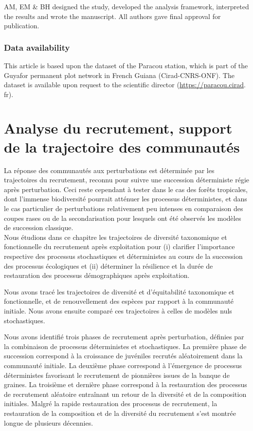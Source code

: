 \documentclass[
  11pt,
  french,
  A4paper,
  extrafontsizes,onecolumn,openright
  ]{memoir}
\begin{document}
AM, EM \& BH designed the study, developed the analysis framework,
interpreted the results and wrote the manuscript. All authors gave final
approval for publication.

\subsection{Data availability}\label{data-availability}

This article is based upon the dataset of the Paracou station, which is
part of the Guyafor permanent plot network in French Guiana
(Cirad-CNRS-ONF). The dataset is available upon request to the
scientific director (\url{https://paracou.cirad}. fr).

\chapter{Analyse du recrutement, support de la trajectoire des
communautés}\label{analyse-du-recrutement-support-de-la-trajectoire-des-communautes}

La réponse des communautés aux perturbations est déterminée par les
trajectoires du recrutement, reconnu pour suivre une succession
déterministe régie après perturbation. Ceci reste cependant à tester
dans le cas des forêts tropicales, dont l'immense biodiversité pourrait
atténuer les processus déterministes, et dans le cas particulier de
perturbations relativement peu intenses en comparaison des coupes rases
ou de la secondarisation pour lesquels ont été observés les modèles de
succession classique.\\
Nous étudions dans ce chapitre les trajectoires de diversité taxonomique
et fonctionnelle du recrutement après exploitation pour (i) clarifier
l'importance respective des processus stochastiques et déterministes au
cours de la succession des processus écologiques et (ii) déterminer la
résilience et la durée de restauration des processus démographiques
après exploitation.

Nous avons tracé les trajectoires de diversité et d'équitabilité
taxonomique et fonctionnelle, et de renouvellement des espèces par
rapport à la communauté initiale. Nous avons ensuite comparé ces
trajectoires à celles de modèles nuls stochastiques.

Nous avons identifié trois phases de recrutement après perturbation,
définies par la combinaison de processus déterministes et stochastiques.
La première phase de succession correspond à la croissance de juvéniles
recrutés aléatoirement dans la communauté initiale. La deuxième phase
correspond à l'émergence de processus déterministes favorisant le
recrutement de pionnières issues de la banque de graines. La troisième
et dernière phase correspond à la restauration des processus de
recrutement aléatoire entraînant un retour de la diversité et de la
composition initiales. Malgré la rapide restauration des processus de
recrutement, la restauration de la composition et de la diversité du
recrutement s'est montrée longue de plusieurs décennies.
\end{document}
